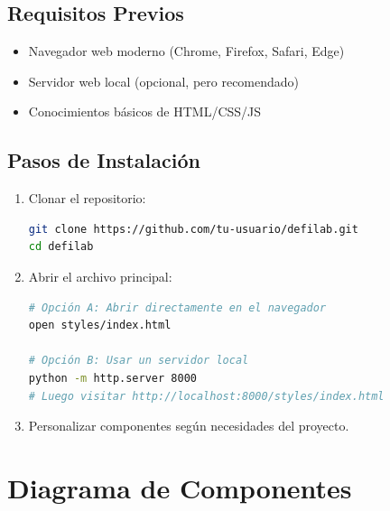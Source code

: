 \documentclass[a4paper,12pt]{article}
\begin{document}
\subsection{Requisitos Previos}
\begin{itemize}
    \item Navegador web moderno (Chrome, Firefox, Safari, Edge)
    \item Servidor web local (opcional, pero recomendado)
    \item Conocimientos básicos de HTML/CSS/JS
\end{itemize}

\subsection{Pasos de Instalación}
\begin{enumerate}
    \item Clonar el repositorio:
    \begin{lstlisting}[language=bash]
git clone https://github.com/tu-usuario/defilab.git
cd defilab
    \end{lstlisting}
    
    \item Abrir el archivo principal:
    \begin{lstlisting}[language=bash]
# Opción A: Abrir directamente en el navegador
open styles/index.html

# Opción B: Usar un servidor local
python -m http.server 8000
# Luego visitar http://localhost:8000/styles/index.html
    \end{lstlisting}
    
    \item Personalizar componentes según necesidades del proyecto.
\end{enumerate}

\section{Diagrama de Componentes}
\end{document}
